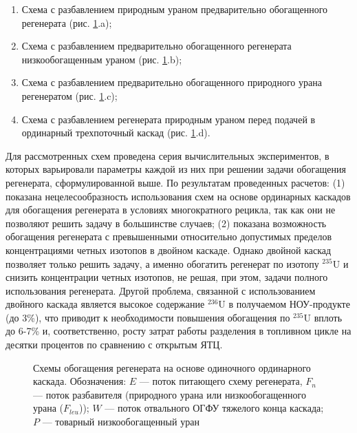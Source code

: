 \begin{enumerate}
  \item Схема с разбавлением природным ураном предварительно обогащенного регенерата (рис. \ref{fig:diagram1ch3}.a);
  \item Схема с разбавлением предварительно обогащенного регенерата низкообогащенным ураном (рис. \ref{fig:diagram1ch3}.b);
  \item Схема с разбавлением предварительно обогащенного природного урана регенератом (рис. \ref{fig:diagram1ch3}.c);
  \item Схема с разбавлением регенерата природным ураном перед подачей в ординарный трехпоточный каскад (рис. \ref{fig:diagram1ch3}.d).
\end{enumerate}

Для рассмотренных схем проведена серия вычислительных экспериментов, в которых варьировали параметры каждой из них при решении задачи обогащения регенерата, сформулированной выше. По результатам проведенных расчетов: (1) показана нецелесообразность использования схем на основе ординарных каскадов для обогащения регенерата в условиях многократного рецикла, так как они не позволяют решить задачу в большинстве случаев; (2) показана возможность обогащения регенерата с превышенными относительно допустимых пределов концентрациями четных изотопов в двойном каскаде. Однако двойной каскад позволяет только решить задачу, а именно обогатить регенерат по изотопу $^{235}$U и снизить концентрации четных изотопов, не решая, при этом, задачи полного использования регенерата. Другой проблема, связанной с использованием двойного каскада является высокое содержание $^{236}$U в получаемом НОУ-продукте (до 3\%), что приводит к необходимости повышения обогащения по $^{235}$U вплоть до 6-7\% и, соответственно, росту затрат работы разделения в топливном цикле на десятки процентов по сравнению с открытым ЯТЦ.

\begin{figure}[ht]
  \caption{Схемы обогащения регенерата на основе одиночного ординарного каскада. Обозначения: $E$ --- поток питающего схему регенерата, $F_n$ --- поток разбавителя (природного урана или низкообогащенного урана ($F_{leu}$)); $W$ --- поток отвального ОГФУ тяжелого конца каскада; $P$ --- товарный низкообогащенный уран}\label{fig:diagram1ch3}
\end{figure}

